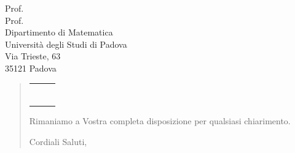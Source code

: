 \documentclass[a4paper,12pt]{letteracdp}
\begin{document}
\begin{letter}{
	Prof. \Tullio{} \\
	Prof. \Riccardo{} \\
	Dipartimento di Matematica \\
	Università degli Studi di Padova \\
	Via Trieste, 63 \\
	35121 Padova}
\begin{quotation}
\begin{table}
\begin{center}
\begin{tabular}{ c c c }
				
		\Daniele{} & \DanieleM{} \\
		\Davide{} & \DavideM{} \\
		\Francesco{} & \FrancescoM{} \\
		\Giosue{} & \GiosueM{} \\
		\Lucrezia{} & \LucreziaM{} \\
		\Matteo{} & \MatteoM{} \\
		\Tommaso{} & \TommasoM{} \\	
				
				\bottomrule
			\end{tabular}
		\end{center}
	\end{table}
	
	Rimaniamo a Vostra completa disposizione per qualsiasi chiarimento.

\vspace{0.5cm}
\closing{ Cordiali Saluti,}

\end{quotation}

\end{letter}
\end{document}
